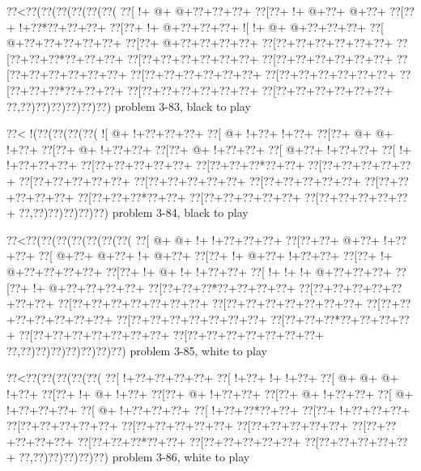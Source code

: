 \vbox{\vbox{\goo
\0??<\0??(\0??(\0??(\0??(\0??(\0??(
\0??[\- !+\- @+\- @+\0??+\0??+\0??+
\0??[\0??+\- !+\- @+\0??+\- @+\0??+
\0??[\0??+\- !+\0??*\0??+\0??+\0??+
\0??[\0??+\- !+\- @+\0??+\0??+\0??+
\- ![\- !+\- @+\- @+\0??+\0??+\0??+
\0??[\- @+\0??+\0??+\0??+\0??+\0??+
\0??[\0??+\- @+\0??+\0??+\0??+\0??+
\0??[\0??+\0??+\0??+\0??+\0??+\0??+
\0??[\0??+\0??+\0??*\0??+\0??+\0??+
\0??[\0??+\0??+\0??+\0??+\0??+\0??+
\0??[\0??+\0??+\0??+\0??+\0??+\0??+
\0??[\0??+\0??+\0??+\0??+\0??+\0??+
\0??[\0??+\0??+\0??+\0??+\0??+\0??+
\0??[\0??+\0??+\0??+\0??+\0??+\0??+
\0??[\0??+\0??+\0??*\0??+\0??+\0??+
\0??[\0??+\0??+\0??+\0??+\0??+\0??+
\0??[\0??+\0??+\0??+\0??+\0??+\0??+
\0??,\0??)\0??)\0??)\0??)\0??)\0??)
}
\hfil problem 3-83, black to play\hfil\break
}

\vbox{\vbox{\goo
\0??<\- !(\0??(\0??(\0??(\0??(
\- ![\- @+\- !+\0??+\0??+\0??+
\0??[\- @+\- !+\0??+\- !+\0??+
\0??[\0??+\- @+\- @+\- !+\0??+
\0??[\0??+\- @+\- !+\0??+\0??+
\0??[\0??+\- @+\- !+\0??+\0??+
\0??[\- @+\0??+\- !+\0??+\0??+
\0??[\- !+\- !+\0??+\0??+\0??+
\0??[\0??+\0??+\0??+\0??+\0??+
\0??[\0??+\0??+\0??*\0??+\0??+
\0??[\0??+\0??+\0??+\0??+\0??+
\0??[\0??+\0??+\0??+\0??+\0??+
\0??[\0??+\0??+\0??+\0??+\0??+
\0??[\0??+\0??+\0??+\0??+\0??+
\0??[\0??+\0??+\0??+\0??+\0??+
\0??[\0??+\0??+\0??*\0??+\0??+
\0??[\0??+\0??+\0??+\0??+\0??+
\0??[\0??+\0??+\0??+\0??+\0??+
\0??,\0??)\0??)\0??)\0??)\0??)
}
\hfil problem 3-84, black to play\hfil\break
}

\vbox{\vbox{\goo
\0??<\0??(\0??(\0??(\0??(\0??(\0??(\0??(
\0??[\- @+\- @+\- !+\- !+\0??+\0??+\0??+
\0??[\0??+\0??+\- @+\0??+\- !+\0??+\0??+
\0??[\- @+\0??+\- @+\0??+\- !+\- @+\0??+
\0??[\0??+\- !+\- @+\0??+\- !+\0??+\0??+
\0??[\0??+\- !+\- @+\0??+\0??+\0??+\0??+
\0??[\0??+\- !+\- @+\- !+\- !+\0??+\0??+
\0??[\- !+\- !+\- !+\- @+\0??+\0??+\0??+
\0??[\0??+\- !+\- @+\0??+\0??+\0??+\0??+
\0??[\0??+\0??+\0??*\0??+\0??+\0??+\0??+
\0??[\0??+\0??+\0??+\0??+\0??+\0??+\0??+
\0??[\0??+\0??+\0??+\0??+\0??+\0??+\0??+
\0??[\0??+\0??+\0??+\0??+\0??+\0??+\0??+
\0??[\0??+\0??+\0??+\0??+\0??+\0??+\0??+
\0??[\0??+\0??+\0??+\0??+\0??+\0??+\0??+
\0??[\0??+\0??+\0??*\0??+\0??+\0??+\0??+
\0??[\0??+\0??+\0??+\0??+\0??+\0??+\0??+
\0??[\0??+\0??+\0??+\0??+\0??+\0??+\0??+
\0??,\0??)\0??)\0??)\0??)\0??)\0??)\0??)
}
\hfil problem 3-85, white to play\hfil\break
}

\vbox{\vbox{\goo
\0??<\0??(\0??(\0??(\0??(\0??(
\0??[\- !+\0??+\0??+\0??+\0??+
\0??[\- !+\0??+\- !+\- !+\0??+
\0??[\- @+\- @+\- @+\- !+\0??+
\0??[\0??+\- !+\- @+\- !+\0??+
\0??[\0??+\- @+\- !+\0??+\0??+
\0??[\0??+\- @+\- !+\0??+\0??+
\0??[\- @+\- !+\0??+\0??+\0??+
\0??[\- @+\- !+\0??+\0??+\0??+
\0??[\- !+\0??+\0??*\0??+\0??+
\0??[\0??+\- !+\0??+\0??+\0??+
\0??[\0??+\0??+\0??+\0??+\0??+
\0??[\0??+\0??+\0??+\0??+\0??+
\0??[\0??+\0??+\0??+\0??+\0??+
\0??[\0??+\0??+\0??+\0??+\0??+
\0??[\0??+\0??+\0??*\0??+\0??+
\0??[\0??+\0??+\0??+\0??+\0??+
\0??[\0??+\0??+\0??+\0??+\0??+
\0??,\0??)\0??)\0??)\0??)\0??)
}
\hfil problem 3-86, white to play\hfil\break
}

